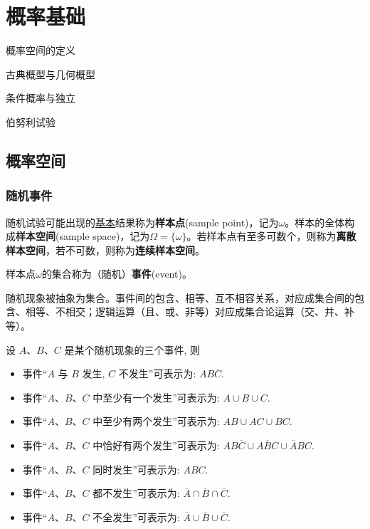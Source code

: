 \chapter{概率基础}\label{chap:probability_space}

\begin{introduction}[考试重点]
    \item 概率空间的定义
    \item 古典概型与几何概型
    \item 条件概率与独立
    \item 伯努利试验
\end{introduction}

\section{概率空间}

\subsection{随机事件}

\begin{definition}[样本空间]
    随机试验可能出现的\underline{基本}结果称为\textbf{样本点}(sample point)，记为$\omega$。样本的全体构成\textbf{样本空间}(sample space)，记为$\Omega=\{ \omega \}$。若样本点有至多可数个，则称为\textbf{离散样本空间}，若不可数，则称为\textbf{连续样本空间}。
\end{definition}

\begin{definition}[事件的古典定义]
    样本点$\omega$的集合称为（随机）\textbf{事件}(event)。
\end{definition}

随机现象被抽象为集合。事件间的包含、相等、互不相容关系，对应成集合间的包含、相等、不相交；逻辑运算（且、或、非等）对应成集合论运算（交、并、补等）。

\begin{example}
    设 $A$、$B$、$C$ 是某个随机现象的三个事件, 则
    \begin{itemize}
        \item 事件“$A$ 与 $B$ 发生, $C$ 不发生”可表示为: $AB\overline{C}$.
        \item 事件“$A$、$B$、$C$ 中至少有一个发生”可表示为: $A \cup B \cup C$.
        \item 事件“$A$、$B$、$C$ 中至少有两个发生”可表示为: $AB \cup AC \cup BC$.
        \item 事件“$A$、$B$、$C$ 中恰好有两个发生”可表示为: $AB\overline{C} \cup A\overline{B}C \cup \overline{A}BC$.
        \item 事件“$A$、$B$、$C$ 同时发生”可表示为: $ABC$.
        \item 事件“$A$、$B$、$C$ 都不发生”可表示为: $\overline{A} \cap \overline{B} \cap \overline{C}$.
        \item 事件“$A$、$B$、$C$ 不全发生”可表示为: $\overline{A} \cup \overline{B} \cup \overline{C}$.
    \end{itemize}
\end{example}

